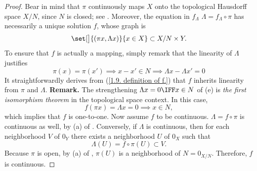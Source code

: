 \begin{proof}
Bear in mind that $\pi$ continuously maps $X$ onto the topological Hausdorff space $X/N$, since $N$ is closed; 
see .
%
Moreover, the equation in $f_\Lambda$ $\Lambda = f_\Lambda \circ \pi$ has necessarily a unique solution $f$, whose graph is %
%
\begin{equation}\label{1.9. definition of f.}
  \set[\big]{(\pi x, \Lambda x)}{x \in X} \subset X/N \times Y.
\end{equation}
%
To ensure that $f$ is actually a mapping, simply remark that the linearity of $\Lambda$ justifies
%
\begin{equation}
  \pi(x) = \pi(x') \implies x -x' \in N \implies \Lambda x - \Lambda  x' = 0
\end{equation}
%
It straightforwardly derives from (\ref{1.9. definition of f.}) that $f$ inherits linearity from $\pi$ and $\Lambda$.
\skipline
{\bf Remark.} The strengthening $\Lambda x = 0 \IFF x \in N$ of (e) is \emph{the first isomorphism theorem} in the topological 
space context. In this case, 
%
\begin{equation}
  f(\pi x) = \Lambda x = 0 \implies x \in N, 
\end{equation}
%
which implies that $f$ is one-to-one. %
\skipline
Now assume $f$ to be continuous. $\Lambda = f\circ \pi $ is continuous as well, by (a) of . Conversely, if %
$\Lambda$ is continuous, then for each neighborhood $V$ of $0_Y$ there exists a neighborhood $U$ of $0_X$ such that
%
\begin{equation}
  \Lambda(U) = f \circ \pi(U)
    \subset
  V.
\end{equation}
%
Because $\pi$ is open, by (a) of , $\pi(U)$ is a neighborhood of $N = 0_{X/N}$. Therefore, $f$ is continuous.
%

\end{proof}

